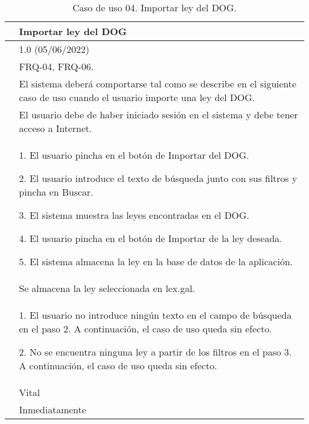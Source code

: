 \begin{table}[H]
\begin{center}
\begin{tabular}{|p{3cm}|p{10cm}|} \hline
\centering {\bf UC-04} & Importar ley del DOG  \\ \hline\hline
\centering {\bf Versión} & 1.0 (05/06/2022) \\ \hline
\centering {\bf Dependencias} &  FRQ-04, FRQ-06. \\ \hline
\centering {\bf Descripción} &  El sistema deberá comportarse tal como se describe en el siguiente caso de uso cuando el usuario importe una ley del DOG. \\ \hline
\centering {\bf Precondición} &  El usuario debe de haber iniciado sesión en el sistema y debe tener acceso a Internet. \\ \hline
\centering {\bf Secuencia normal} &  
1. El usuario pincha en el botón de Importar del DOG.

2. El usuario introduce el texto de búsqueda junto con sus filtros y pincha en Buscar.

3. El sistema muestra las leyes encontradas en el DOG.

4. El usuario pincha en el botón de Importar de la ley deseada.

5. El sistema almacena la ley en la base de datos de la aplicación.
\\ \hline
\centering {\bf Postcondición} &  Se almacena la ley seleccionada en lex.gal. \\ \hline
\centering {\bf Excepciones} & 
1. El usuario no introduce ningún texto en el campo de búsqueda en el paso 2. A continuación, el caso de uso queda sin efecto.

2. No se encuentra ninguna ley a partir de los filtros en el paso 3. A continuación, el caso de uso queda sin efecto.
\\ \hline
\centering {\bf Importancia} & Vital \\ \hline
\centering {\bf Urgencia} & Inmediatamente \\ \hline
\end{tabular}
\caption{Caso de uso 04. Importar ley del DOG.}
\label{enlaceUC4}
\end{center}
\end{table}

